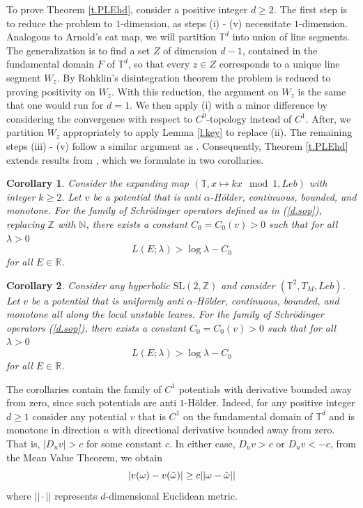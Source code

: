 \documentclass{amsart}
\newtheorem{corollary}{Corollary}
\newcommand{\NN}{\mathbb{N}}
\newcommand{\RR}{\mathbb{R}}
\newcommand{\TT}{\mathbb{T}}
\newcommand{\ZZ}{\mathbb{Z}}
\begin{document}
To prove Theorem \ref{t.PLEhd}, consider a positive integer $d\geq 2$. The first step is to reduce the problem to $1$-dimension, as steps (i) - (v) necessitate $1$-dimension. Analogous to Arnold's cat map, we will partition $\TT^d$ into union of line segments. The generalization is to find a set $Z$ of dimension $d-1$, contained in the fundamental domain $F$ of $\TT^d$, so that every $z\in Z$ corresponds to a unique line segment $W_z$. By Rohklin's disintegration theorem the problem is reduced to proving positivity on $W_z$. With this reduction, the argument on $W_z$ is the same that one would run for $d=1$. We then apply (i) with a minor difference by considering the convergence with respect to $C^0$-topology instead of $C^1$. After, we partition $W_z$ appropriately to apply Lemma \ref{l.key} to replace (ii). The remaining steps (iii) - (v) follow a similar argument as \cite{zhenghe2}. Consequently, Theorem \ref{t.PLEhd} extends results from \cite{zhenghe2, chiem}, which we formulate in two corollaries.

\begin{corollary}
    Consider the expanding map $(\TT, x\mapsto kx \mod 1, Leb)$ with integer $k\geq 2$. Let $v$ be a potential that is anti $\alpha$-H\"older, continuous, bounded, and monotone. For the family of Schr\"odinger operators defined as in (\ref{d.sop}), replacing $\ZZ$ with $\NN$, there exists a constant $C_0 = C_0(v) > 0$ such that for all $\lambda>0$
    \[L(E;\lambda) > \log\lambda - C_0\]
    for all $E\in \RR$.
\end{corollary}

\begin{corollary}
    Consider any hyperbolic $\mathrm{SL}(2,\ZZ)$ and consider $(\TT^2, T_M,  Leb)$. Let $v$ be a potential that is uniformly anti $\alpha$-H\"older, continuous, bounded, and monotone all along the local unstable leaves. For the family of Schr\"odinger operators (\ref{d.sop}), there exists a constant $C_0 = C_0(v)>0$ such that for all $\lambda > 0$
    \[L(E; \lambda) > \log\lambda - C_0\]
    for all $E\in \RR$.
\end{corollary}

The corollaries contain the family of $C^1$ potentials with derivative bounded away from zero, since such potentials are anti $1$-H\"older. Indeed, for any positive integer $d\geq 1$ consider any potential $v$ that is $C^1$ on the fundamental domain of $\TT^d$ and is monotone in direction $u$ with directional derivative bounded away from zero. That is, $|D_u v| > c$ for some constant $c$. In either case, $D_u v > c$ or $D_u v< -c$, from the Mean Value Theorem, we obtain
\[|v(\omega)- v(\Tilde{\omega})|\geq c ||\omega - \Tilde{\omega}||\]
where $||\cdot||$ represents $d$-dimensional Euclidean metric.
\end{document}
